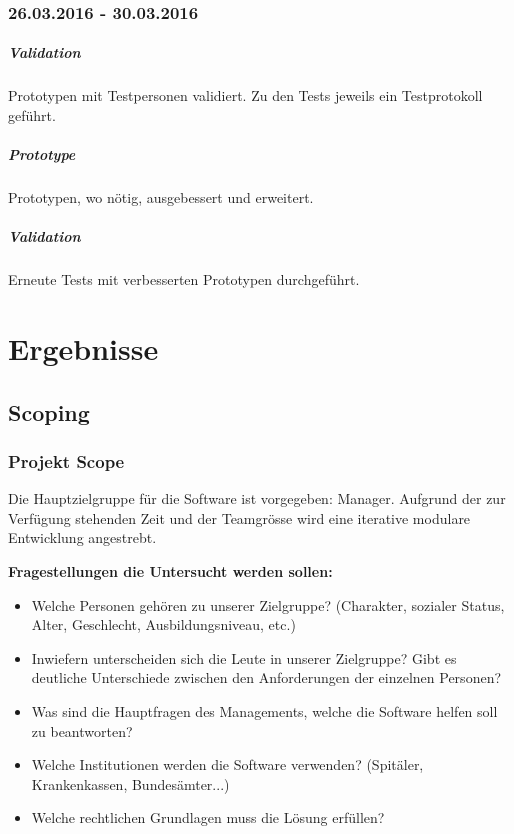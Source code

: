 \documentclass[a4paper]{scrreprt}
\begin{document}
\subsection*{26.03.2016 - 30.03.2016}
\paragraph{Validation}
Prototypen mit Testpersonen validiert. Zu den Tests jeweils ein Testprotokoll geführt.


\paragraph{Prototype}
Prototypen, wo nötig, ausgebessert und erweitert.


\paragraph{Validation}
Erneute Tests mit verbesserten Prototypen durchgeführt.



\chapter{Ergebnisse}
\section{Scoping}

\subsection{Projekt Scope}
Die Hauptzielgruppe für die Software ist vorgegeben: Manager. Aufgrund der zur Verfügung stehenden Zeit
und der Teamgrösse wird eine iterative modulare Entwicklung angestrebt.

\bigskip


\textbf{Fragestellungen die Untersucht werden sollen:}
\begin{itemize}
\item Welche Personen gehören zu unserer Zielgruppe? (Charakter, sozialer Status, Alter, Geschlecht, Ausbildungsniveau, etc.)
\item Inwiefern unterscheiden sich die Leute in unserer Zielgruppe? Gibt es deutliche Unterschiede zwischen den Anforderungen der einzelnen Personen?
\item Was sind die Hauptfragen des Managements, welche die Software helfen soll zu beantworten?
\item Welche Institutionen werden die Software verwenden? (Spitäler, Krankenkassen, Bundesämter...)
\item Welche rechtlichen Grundlagen muss die Lösung erfüllen?
\end{itemize}
\end{document}
